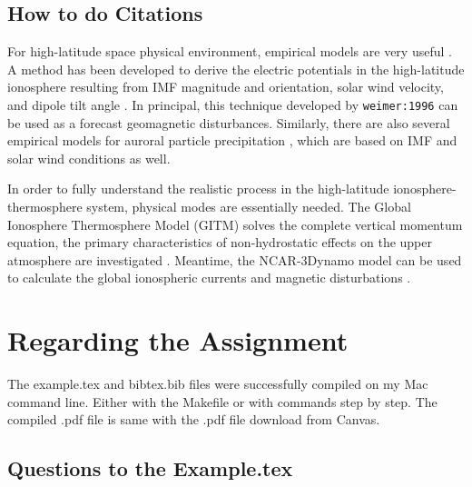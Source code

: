 \documentclass[12pt, letterpaper]{article} %
\begin{document}
\subsection{How to do Citations} %
For high-latitude space physical environment, empirical models are very useful  
\citet{weimer:1996}. A method has been developed to derive the electric potentials 
in the high-latitude ionosphere resulting from IMF magnitude and orientation, solar 
wind velocity, and dipole tilt angle \citep[chap. 2]{weimer:1996}. In principal, this 
technique developed by {\tt weimer:1996} can be used as a forecast geomagnetic 
disturbances. Similarly, there are also several empirical models for auroral particle 
precipitation \cite[]{hardy:1989,Fuller-Rowell1987}, which are based on IMF and 
solar wind conditions as well. 

In order to fully understand the realistic process in the high-latitude ionosphere-
thermosphere system, physical modes are essentially needed. The Global Ionosphere 
Thermosphere Model (GITM) solves the complete vertical momentum equation, the 
primary characteristics of non-hydrostatic effects on the upper atmosphere are 
investigated \cite[p. 13]{Deng2008}. Meantime, the NCAR-3Dynamo model can 
be used to calculate the global ionospheric currents and magnetic disturbations 
\citep[see][chap. 5]{Maute2017}.





\newpage %
\section{Regarding the Assignment} %

The example.tex and bibtex.bib files were successfully compiled on my Mac command line.
Either with the Makefile or with commands step by step. The compiled .pdf file is same with 
the .pdf file download from Canvas.

\subsection{Questions to the Example.tex} %
\end{document}
